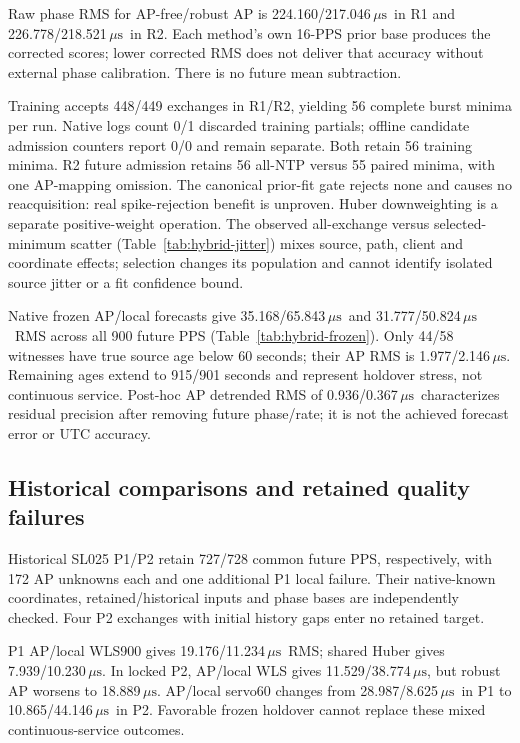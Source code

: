 \documentclass[10pt,letterpaper]{article}
\newcommand{\us}{\ensuremath{\,\mu\mathrm{s}}}
\begin{document}
Raw phase RMS for AP-free/robust AP is 224.160/217.046\us\ in R1 and
226.778/218.521\us\ in R2. Each method's own 16-PPS prior base produces the
corrected scores; lower corrected RMS does not deliver that accuracy without
external phase calibration. There is no future mean subtraction.

Training accepts 448/449 exchanges in R1/R2, yielding 56 complete burst minima
per run. Native logs count 0/1 discarded training partials; offline candidate
admission counters report 0/0 and remain separate. Both retain 56 training
minima. R2 future admission retains 56 all-NTP versus 55 paired minima, with
one AP-mapping omission. The canonical prior-fit gate rejects none and causes
no reacquisition: real spike-rejection benefit is unproven.
Huber downweighting is a separate positive-weight operation. The observed
all-exchange versus selected-minimum scatter (Table~\ref{tab:hybrid-jitter})
mixes source, path, client and coordinate effects; selection changes its
population and cannot identify isolated source jitter or a fit confidence bound.

Native frozen AP/local forecasts give 35.168/65.843\us\ and
31.777/50.824\us\ RMS across all 900 future PPS
(Table~\ref{tab:hybrid-frozen}). Only 44/58 witnesses have true source age below
60 seconds; their AP RMS is 1.977/2.146\us. Remaining ages extend to 915/901
seconds and represent holdover stress, not continuous service. Post-hoc AP
detrended RMS of 0.936/0.367\us\ characterizes residual precision after removing
future phase/rate; it is not the achieved forecast error or UTC accuracy.

\subsection{Historical comparisons and retained quality failures}
Historical SL025 P1/P2 retain 727/728 common future PPS, respectively, with
172 AP unknowns each and one additional P1 local failure. Their native-known
coordinates, retained/historical inputs and phase bases are independently
checked. Four P2 exchanges with initial history gaps enter no retained target.

P1 AP/local WLS900 gives 19.176/11.234\us\ RMS; shared Huber gives
7.939/10.230\us. In locked P2, AP/local WLS gives 11.529/38.774\us, but robust
AP worsens to 18.889\us. AP/local servo60 changes from 28.987/8.625\us\ in P1
to 10.865/44.146\us\ in P2. Favorable frozen holdover cannot replace these
mixed continuous-service outcomes.
\end{document}
